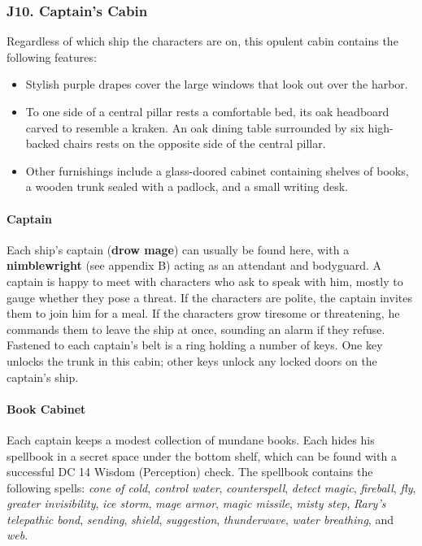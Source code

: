 \documentclass[10pt,a4paper,twoside,twocolumn,openany,nodeprecatedcode]{dndbook}
\begin{document}
\subsubsection{J10. Captain's Cabin}
Regardless of which ship the characters are on, this opulent cabin contains the following features:
\begin{itemize}

\item Stylish purple drapes cover the large windows that look out over the harbor.
\item To one side of a central pillar rests a comfortable bed, its oak headboard carved to resemble a kraken. An oak dining table surrounded by six high-backed chairs rests on the opposite side of the central pillar.
\item Other furnishings include a glass-doored cabinet containing shelves of books, a wooden trunk sealed with a padlock, and a small writing desk.
\end{itemize}


\paragraph{Captain}
Each ship's captain (\textbf{drow mage}) can usually be found here, with a \textbf{nimblewright} (see appendix B) acting as an attendant and bodyguard.
A captain is happy to meet with characters who ask to speak with him, mostly to gauge whether they pose a threat. If the characters are polite, the captain invites them to join him for a meal. If the characters grow tiresome or threatening, he commands them to leave the ship at once, sounding an alarm if they refuse.
Fastened to each captain's belt is a ring holding a number of keys. One key unlocks the trunk in this cabin; other keys unlock any locked doors on the captain's ship.
\paragraph{Book Cabinet}
Each captain keeps a modest collection of mundane books. Each hides his spellbook in a secret space under the bottom shelf, which can be found with a successful DC 14 Wisdom (Perception) check. The spellbook contains the following spells: \textit{cone of cold}, \textit{control water}, \textit{counterspell}, \textit{detect magic}, \textit{fireball}, \textit{fly}, \textit{greater invisibility}, \textit{ice storm}, \textit{mage armor}, \textit{magic missile}, \textit{misty step}, \textit{Rary's telepathic bond}, \textit{sending}, \textit{shield}, \textit{suggestion}, \textit{thunderwave}, \textit{water breathing}, and \textit{web}.
\end{document}
